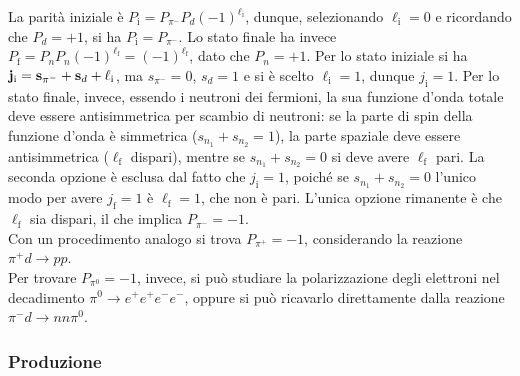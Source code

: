 La parità iniziale è $ P_{\text{i}} = P_{\pi^-} P_d \left( -1 \right)^{\ell_{\text{i}}} $, dunque, selezionando $ \ell_{\text{i}} = 0 $ e ricordando che $ P_d = +1 $, si ha $ P_{\text{i}} = P_{\pi^-} $. Lo stato finale ha invece $ P_{\text{f}} = P_n P_n \left( -1 \right)^{\ell_{\text{f}}} = \left( -1 \right)^{\ell_{\text{f}}} $, dato che $ P_n = +1 $. Per lo stato iniziale si ha $ \mathbf{j}_{\text{i}} = \mathbf{s}_{\pi^-} + \mathbf{s}_d + \mathbf{\ell}_{\text{i}} $, ma $ s_{\pi^-} = 0 $, $ s_d = 1 $ e si è scelto $ \ell_{\text{i}} = 1 $, dunque $ j_{\text{i}} = 1 $. Per lo stato finale, invece, essendo i neutroni dei fermioni, la sua funzione d'onda totale deve essere antisimmetrica per scambio di neutroni: se la parte di spin della funzione d'onda è simmetrica ($ s_{n_1} + s_{n_2} = 1 $), la parte spaziale deve essere antisimmetrica ($ \ell_{\text{f}} $ dispari), mentre se $ s_{n_1} + s_{n_2} = 0 $ si deve avere $ \ell_{\text{f}} $ pari. La seconda opzione è esclusa dal fatto che $ j_{\text{i}} = 1 $, poiché se $ s_{n_1} + s_{n_2} = 0 $ l'unico modo per avere $ j_{\text{f}} = 1 $ è $ \ell_{\text{f}} = 1 $, che non è pari. L'unica opzione rimanente è che $ \ell_{\text{f}} $ sia dispari, il che implica $ P_{\pi^-} = -1 $.\\
Con un procedimento analogo si trova $ P_{\pi^+} = -1 $, considerando la reazione $ \pi^+ d \rightarrow p p $.\\
Per trovare $ P_{\pi^0} = -1 $, invece, si può studiare la polarizzazione degli elettroni nel decadimento $ \pi^0 \rightarrow e^+ e^+ e^- e^- $, oppure si può ricavarlo direttamente dalla reazione $ \pi^- d \rightarrow n n \pi^0 $.

\subsubsection{Produzione}

